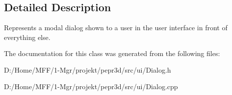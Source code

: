 \subsection{Detailed Description}
Represents a modal dialog shown to a user in the user interface in front of everything else. 

The documentation for this class was generated from the following files\+:\begin{DoxyCompactItemize}
\item 
D\+:/\+Home/\+M\+F\+F/1-\/\+Mgr/projekt/pepr3d/src/ui/Dialog.\+h\item 
D\+:/\+Home/\+M\+F\+F/1-\/\+Mgr/projekt/pepr3d/src/ui/Dialog.\+cpp\end{DoxyCompactItemize}
